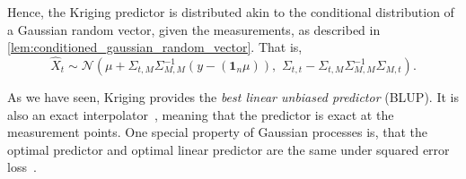 Hence, the Kriging predictor is distributed akin to the conditional distribution of a Gaussian random vector, given the measurements, as described in \cref{lem:conditioned_gaussian_random_vector}.
That is,
\begin{equation}\label{eq:kriging_predictor}
    \hat{X}_{t} \sim \mathcal{N}\left(\mu+\Sigma_{t,M}\Sigma_{M,M}^{-1}(y-(\mathbf{1}_{n}\mu)),\,\, \Sigma_{t,t} - \Sigma_{t,M} \Sigma_{M,M}^{-1} \Sigma_{M,t} \right).
\end{equation}





As we have seen, Kriging provides the \textit{best linear unbiased predictor} (BLUP).  
It is also an exact interpolator~\cite[p.359]{cressie1993statistics}, meaning that the predictor is exact at the measurement points.
One special property of Gaussian processes is, that the optimal predictor and optimal linear predictor are the same under squared error loss~\cite[p.110]{cressie1993statistics}.






